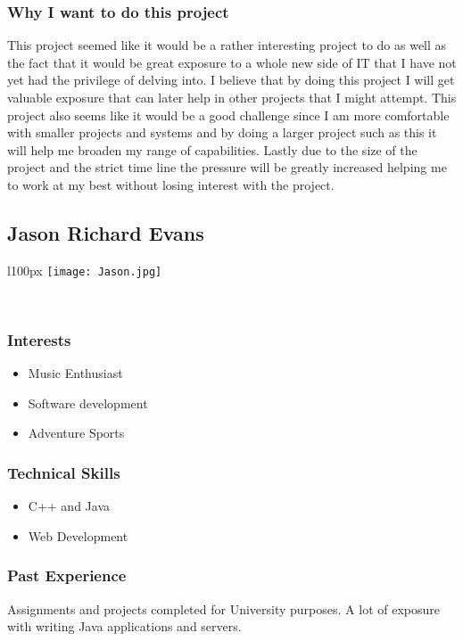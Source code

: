 \subsubsection{Why I want to do this project}
This project seemed like it would be a rather interesting project to do as well as the fact that it would be great exposure to a whole new side of IT that I have not yet had the privilege of delving into. I believe that by doing this project I will get valuable exposure that can later help in other projects that I might attempt. This project also seems like it would be a good challenge since I am more comfortable with smaller projects and systems and by doing a larger project such as this it will help me broaden my range of capabilities. Lastly due to the size of the project and the strict time line the pressure will be greatly increased helping me to work at my best without losing interest with the project. 

\pagebreak
\subsection{Jason Richard Evans}
\begin{wrapfigure}[5]{l}{100px}
\vspace{10pt}
\texttt{[image: Jason.jpg]}
\end{wrapfigure}

\textcolor{white}{.}
\subsubsection{Interests}
\begin{itemize}
	\item{Music Enthusiast}
	\item{Software development}
	\item{Adventure Sports}
\end{itemize}
\subsubsection{Technical Skills}
\begin{itemize}
	\item{C++ and Java}
	\item{Web Development}
\end{itemize}
\subsubsection{Past Experience}
Assignments and projects completed for University purposes. A lot of exposure with writing Java applications and servers.
